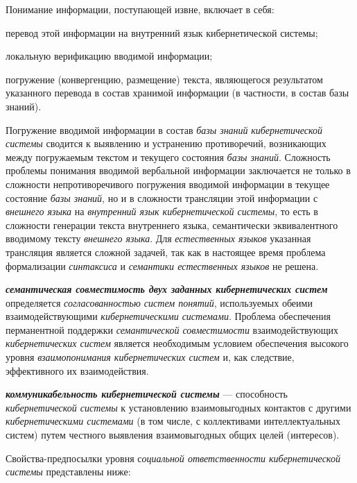 Понимание информации, поступающей извне, включает в себя:
\begin{textitemize}
    \item перевод этой информации на внутренний язык кибернетической системы;
    \item локальную верификацию вводимой информации;
    \item погружение (конвергенцию, размещение) текста, являющегося результатом указанного перевода в состав хранимой информации (в частности, в состав базы знаний).
\end{textitemize}

Погружение вводимой информации в состав \textit{базы знаний} \textit{кибернетической системы} сводится к выявлению и устранению противоречий, возникающих между погружаемым текстом и текущего состояния \textit{базы знаний}. Сложность проблемы понимания вводимой вербальной информации заключается не только в сложности непротиворечивого погружения вводимой информации в текущее состояние \textit{базы знаний}, но и в сложности трансляции этой информации с \textit{внешнего языка} на \textit{внутренний язык кибернетической системы}, то есть в сложности генерации текста внутреннего языка, семантически эквивалентного вводимому тексту \textit{внешнего языка}.
Для \textit{естественных языков} указанная трансляция является сложной задачей, так как в настоящее время проблема формализации \textit{синтаксиса} и \textit{семантики естественных языков} не решена.

\textbf{\textit{семантическая совместимость двух заданных кибернетических систем}} определяется \textit{согласованностью систем понятий}, используемых обеими взаимодействующими \textit{кибернетическими системами}.
Проблема обеспечения перманентной поддержки \textit{семантической совместимости} взаимодействующих \textit{кибернетических систем} является необходимым условием обеспечения высокого уровня \textit{взаимопонимания кибернетических систем} и, как следствие, эффективного их взаимодействия.

\textbf{\textit{коммуникабельность кибернетической системы}} --- способность \textit{кибернетической системы} к установлению взаимовыгодных контактов с другими \textit{кибернетическими системами} (в том числе, с коллективами интеллектуальных систем) путем честного выявления взаимовыгодных общих целей (интересов).

Свойства-предпосылки уровня с\textit{оциальной ответственности кибернетической системы} представлены ниже:

